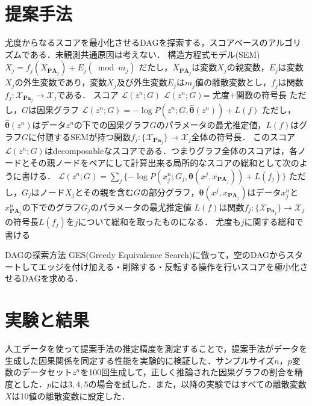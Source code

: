 \documentclass[dvipdfmx]{jsarticle}
\begin{document}
\section{提案手法}


\begin{outline}
尤度からなるスコアを最小化させるDAGを探索する，スコアベースのアルゴリズムである．未観測共通原因は考えない．
\1 構造方程式モデル(SEM)
    \2 $X_j = f_j(X_{\textbf{PA}_j}) + E_j (\bmod m_j)$
        \3 だたし，$X_{\textbf{PA}_j}$は変数$X_j$の親変数，$E_j$は変数$X_j$の外生変数であり，変数$X_j$及び外生変数$E_j$は$m_j$値の離散変数とし，$f_j$は関数$f_j: \mathcal{X}_{\textbf{Pa}_{j}} \to \mathcal{X}_j$である．
\1 スコア $\mathcal{L}(z^n; G)$
    \2 $\mathcal{L}(z^n; G)$= 尤度+関数の符号長
        \3 ただし，$G$は因果グラフ
    \2 $\mathcal{L}(z^n; G) = - \log P(z^n; G, \hat{\bm{\theta}}(z^n)) + L(f)$
        \3 ただし，$ \hat{\bm{\theta}}(z^n)$はデータ$z^n$の下での因果グラフ$G$のパラメータの最尤推定値，$L(f)$はグラフ$G$に付随するSEMが持つ関数$f_j: \{\mathcal{X}_{\textbf{Pa}_{j}}\} \to \mathcal{X}_j$全体の符号長．
    \2 このスコア$\mathcal{L}(z^n; G)$はdecomposableなスコアである．つまりグラフ全体のスコアは，各ノードとその親ノードをペアにして計算出来る局所的なスコアの総和として次のように書ける．
        \3 $\mathcal{L}(z^n; G) = \sum_{j} \{- \log P(x_j^n; G_{j}, \bm{\theta}(x^j, x_{\textbf{PA}_j})) + L(f_j)\}$ 
            \4 ただし，$G_j$はノード$X_j$とその親を含む$G$の部分グラフ，$\bm{\theta}(x^j, x_{\textbf{PA}_j})$はデータ$x_j^n$と$x_{\textbf{PA}_j}^n$の下でのグラフ$G_j$のパラメータの最尤推定値
        \3 $L(f)$は関数$f_j: \{\mathcal{X}_{\textbf{Pa}_{j}}\} \to \mathcal{X}_j$の符号長$L(f_j)$を$j$について総和を取ったものになる．
        \3 尤度も$j$に関する総和で書ける
        

\1 DAGの探索方法
    \2 GES(Greedy Equivalence Search)\cite{hauser2012characterization}に倣って，空のDAGからスタートしてエッジを付け加える・削除する・反転する操作を行いスコアを極小化させるDAGを求める．
\end{outline}

\section{実験と結果}
人工データを使って提案手法の推定精度を測定することで，提案手法がデータを生成した因果関係を同定する性能を実験的に検証した．サンプルサイズ$n$，$p$変数のデータセット$z^n$を100回生成して，正しく推論された因果グラフの割合を精度とした．$p$には$3,4,5$の場合を試した．また，以降の実験ではすべての離散変数$X$は10値の離散変数に設定した．
\end{document}
